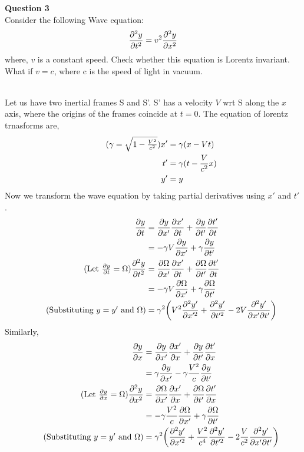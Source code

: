 \documentclass[addpoints]{exam}
\begin{document}
\begin{questions}
\question \textbf{ Question 3}\\
Consider the following Wave equation:
\begin{align*}
    \pdv[2]{y}{t} = v^2\pdv[2]{y}{x}
\end{align*}
where, $v$ is a constant speed. Check whether this equation is Lorentz invariant. What if
$v=c$, where c is the speed of light in vacuum.
\begin{solution}\\
    Let us have two inertial frames S and S'. S' has a velocity $V$ wrt S along the $x$ axis,
    where the origins of the frames coincide at $t=0$. The equation of lorentz trnasforms are,
    \begin{align*}
        \tag{$\gamma =\sqrt{1-\frac{V^2}{c^2}} $}
        x' &= \gamma(x-Vt) \\ 
        t' &= \gamma(t - \frac{V}{c^2}x)\\ 
        y'&=y
    \end{align*}
    Now we transform the wave equation by taking partial derivatives using $x'$ and $t'$.
    \begin{align*}
        \pdv{y}{t} &= \pdv{y}{x'}\pdv{x'}{t} + \pdv{y}{t'}\pdv{t'}{t} \\ 
                   &= -\gamma V\pdv{y}{x'} + \gamma \pdv{y}{t'} \\ 
        \tag{Let $\pdv{y}{t} = \Omega $}
        \pdv[2]{y}{t} &= \pdv{\Omega}{x'}\pdv{x'}{t} + \pdv{\Omega}{t'}\pdv{t'}{t}\\ 
                      &= -\gamma V\pdv{\Omega}{x'} + \gamma \pdv{\Omega}{t'}\\ 
                      \tag{Substituting $y=y'$ and $\Omega$}
                      &=\gamma^2\qty(V^2\frac{\partial^2 y'}{\partial x'^2}+\frac{\partial^2 y'}{\partial t'^2}-2V\pdv[2]{y'}{x'}{t'})
    \end{align*}
    Similarly,
    \begin{align*}
        \pdv{y}{x} &= \pdv{y}{x'}\pdv{x'}{x} + \pdv{y}{t'}\pdv{t'}{x} \\ 
                   &= \gamma \pdv{y}{x'} - \gamma \frac{V^2}{c}\pdv{y}{t'} \\ 
        \tag{Let $\pdv{y}{x} = \Omega $}
        \pdv[2]{y}{x} &= \pdv{\Omega}{x'}\pdv{x'}{x} + \pdv{\Omega}{t'}\pdv{t'}{x} \\
                      &= -\gamma \frac{V^2}{c}\pdv{\Omega}{x'} + \gamma \pdv{\Omega}{t'} \\ 
                      \tag{Substituting $y=y'$ and $\Omega$}
                      &=\gamma^2\qty(\frac{\partial^2 y'}{\partial x'^2}+\frac{V^2}{c^4}\frac{\partial^2 y'}{\partial t'^2}-2\frac{V}{c^2}\pdv[2]{y'}{x'}{t'})

\end{align*}
\end{solution}
\end{questions}
\end{document}
